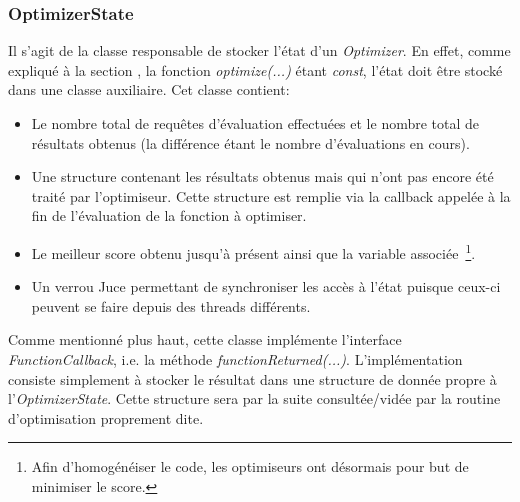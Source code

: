 \documentclass[a4paper, 11pt]{report}
\begin{document}


\subsubsection{OptimizerState}
Il s'agit de la classe responsable de stocker l'état d'un \textit{Optimizer}. En effet, comme expliqué à la section %
, la fonction \textit{optimize(...)} étant \textit{const}, l'état doit être stocké dans une classe auxiliaire. Cet classe contient:
\begin{itemize}
\item Le nombre total de requêtes d'évaluation effectuées et le nombre total de résultats obtenus (la différence étant le nombre d'évaluations en cours).
\item Une structure contenant les résultats obtenus mais qui n'ont pas encore été traité par l'optimiseur. Cette structure est remplie via la callback appelée à la fin de l'évaluation de la fonction à optimiser.
\item Le meilleur score obtenu jusqu'à présent ainsi que la variable associée~\footnote{Afin d'homogénéiser le code, les optimiseurs ont désormais pour but de minimiser le score.}.
\item Un verrou Juce permettant de synchroniser les accès à l'état puisque ceux-ci peuvent se faire depuis des threads différents.
\end{itemize}

Comme mentionné plus haut, cette classe implémente l'interface \textit{FunctionCallback}, i.e. la méthode \textit{functionReturned(...)}. L'implémentation consiste simplement à stocker le résultat dans une structure de donnée propre à l'\textit{OptimizerState}. Cette structure sera par la suite consultée/vidée par la routine d'optimisation proprement dite.
\end{document}
